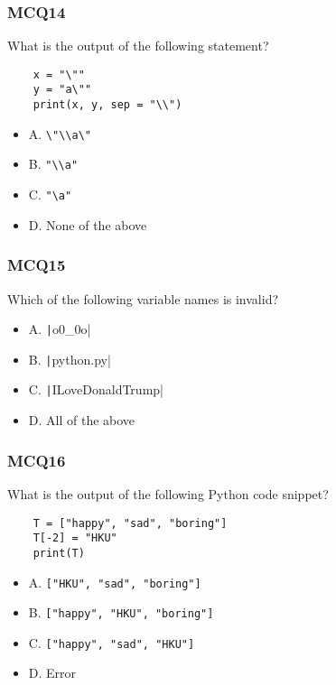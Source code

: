 \documentclass{beamer}
\newcommand{\python}[1]{\texttt|#1|}
\begin{document}
\begin{frame}[fragile]
    \frametitle{MCQ14}
    What is the output of the following statement?
    \begin{verbatim}
    x = "\""
    y = "a\""
    print(x, y, sep = "\\")
    \end{verbatim}
    \begin{itemize}
        \item A. \texttt{\textbackslash"\textbackslash\textbackslash a\textbackslash"}
        \item B. \texttt{"\textbackslash\textbackslash a"}
        \item C. \texttt{"\textbackslash a"}
        \item D. None of the above
    \end{itemize}
\end{frame}

\begin{frame}[fragile]
    \frametitle{MCQ15}
    Which of the following variable names is invalid?
    \begin{itemize}
        \item A. \python{o0_0o}
        \item B. \python{python.py}
        \item C. \python{ILoveDonaldTrump}
        \item D. All of the above
    \end{itemize}
\end{frame}

\begin{frame}[fragile]
    \frametitle{MCQ16}
    What is the output of the following Python code snippet?
    \begin{verbatim}
    T = ["happy", "sad", "boring"]
    T[-2] = "HKU"
    print(T)
    \end{verbatim}
    \begin{itemize}
        \item A. \texttt{["HKU", "sad", "boring"]}
        \item B. \texttt{["happy", "HKU", "boring"]}
        \item C. \texttt{["happy", "sad", "HKU"]}
        \item D. Error
    \end{itemize}
\end{frame}
\end{document}
